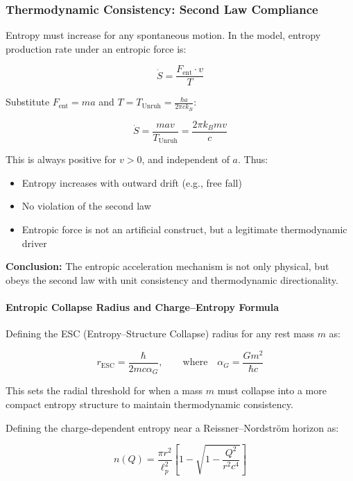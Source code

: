 \documentclass[12pt]{article}
\begin{document}
\subsubsection*{Thermodynamic Consistency: Second Law Compliance}

Entropy must increase for any spontaneous motion. In the model, entropy production rate under an entropic force is:

\[
\dot{S} = \frac{F_{\text{ent}} \cdot v}{T}
\]

Substitute $F_{\text{ent}} = m a$ and $T = T_{\text{Unruh}} = \frac{\hbar a}{2\pi c k_B}$:

\[
\dot{S} = \frac{m a v}{T_{\text{Unruh}}} = \frac{2\pi k_B m v}{c}
\]

This is always positive for $v > 0$, and independent of $a$. Thus:

\begin{itemize}
    \item Entropy increases with outward drift (e.g., free fall)
    \item No violation of the second law
    \item Entropic force is not an artificial construct, but a legitimate thermodynamic driver
\end{itemize}

\noindent
\textbf{Conclusion:} The entropic acceleration mechanism is not only physical, but obeys the second law with unit consistency and thermodynamic directionality.

\paragraph{Entropic Collapse Radius and Charge–Entropy Formula}

\noindent
Defining the ESC (Entropy–Structure Collapse) radius for any rest mass $m$ as:

\[
\boxed{r_{\text{ESC}} = \frac{\hbar}{2 m c \alpha_G}}, \qquad \text{where} \quad \alpha_G = \frac{G m^2}{\hbar c}
\]

This sets the radial threshold for when a mass $m$ must collapse into a more compact entropy structure to maintain thermodynamic consistency.

\vspace{1em}
\noindent
Defining the charge-dependent entropy near a Reissner–Nordström horizon as:

\[
\boxed{n(Q) = \frac{\pi r^2}{\ell_p^2} \left[ 1 - \sqrt{1 - \frac{Q^2}{r^2 c^4}} \right]}
\]
\end{document}
